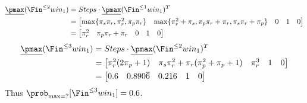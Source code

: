 \begin{align*}
	\underline{\pmax}(\Fin^{\le 2} win_1) & = Steps \cdot \underline{\pmax}(\Fin^{\le 1} win_1)^T                                                                         \\
	                                      & = \begin{bmatrix}
		                                          \max \{ \pi_s\pi_r, \pi_r^2, \pi_p\pi_r \} & \max \{ \pi_r^2 + \pi_s, \pi_p\pi_r + \pi_r, \pi_s\pi_r + \pi_p \} & 0 & 1 & 0
	                                          \end{bmatrix} \\
	                                      & = \begin{bmatrix} \pi_r^2 & \pi_p\pi_r + \pi_r & 0 & 1 & 0 \end{bmatrix}
\end{align*}
\begin{align*}
	\underline{\pmax}(\Fin^{\le 3} win_1) & = Steps \cdot \underline{\pmax}(\Fin^{\le 2} win_1)^T \\
	                                      & = \begin{bmatrix}
		                                          \pi_r^2(2\pi_p + 1)                   &
		                                          \pi_s\pi_r^2 + \pi_r(\pi_p^2+\pi_p+1) &
		                                          \pi_r^3                               &
		                                          1                                     &
		                                          0
	                                          \end{bmatrix}             \\
	                                      & = \begin{bmatrix}
		                                          0.6               &
		                                          0.890\overline{6} &
		                                          0.216             &
		                                          1                 &
		                                          0
	                                          \end{bmatrix}
\end{align*}
Thus $\prob_{\max=?}[\Fin^{\le 3} win_1] = 0.6$.

